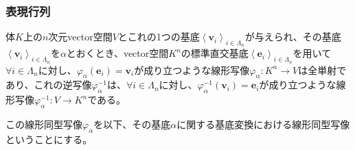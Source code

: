 \documentclass[dvipdfmx]{jsarticle}
\begin{document}
\subsubsection{表現行列}%
\begin{thm}
\label{2.1.5.1}
体$K$上の$n$次元vector空間$V$とこれの1つの基底$\left\langle \mathbf{v}_{i} \right\rangle_{i \in \varLambda_{n}}$が与えられ、その基底$\left\langle \mathbf{v}_{i} \right\rangle_{i \in \varLambda_{n}}$を$\alpha$とおくとき、vector空間$K^{n}$の標準直交基底$\left\langle \mathbf{e}_{i} \right\rangle_{i \in \varLambda_{n}}$を用いて$\forall i \in \varLambda_{n}$に対し、$\varphi_{\alpha}\left( \mathbf{e}_{i} \right) = \mathbf{v}_{i}$が成り立つような線形写像$\varphi_{\alpha}:K^{n} \rightarrow V$は全単射であり、これの逆写像$\varphi_{\alpha}^{- 1}$は、$\forall i \in \varLambda_{n}$に対し、$\varphi_{\alpha}^{- 1}\left( \mathbf{v}_{i} \right) = \mathbf{e}_{i}$が成り立つような線形写像$\varphi_{\alpha}^{- 1}:V \rightarrow K^{n}$である。
\end{thm}\par
\begin{dfn}
この線形同型写像$\varphi_{\alpha}$を以下、その基底$\alpha$に関する基底変換における線形同型写像ということにする。
\end{dfn}
\end{document}
